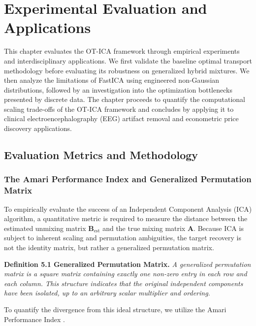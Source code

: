 \documentclass[12pt,a4paper,twoside,openany]{book}
\begin{document}
\chapter{Experimental Evaluation and Applications}

This chapter evaluates the OT-ICA framework through empirical experiments and interdisciplinary applications. 
We first validate the baseline optimal transport methodology before evaluating its robustness on generalized hybrid mixtures. 
We then analyze the limitations of FastICA using engineered non-Gaussian distributions, 
followed by an investigation into the optimization bottlenecks presented by discrete data. 
The chapter proceeds to quantify the computational scaling trade-offs of the OT-ICA framework and concludes by applying it 
to clinical electroencephalography (EEG) artifact removal and econometric price discovery applications.

\section{Evaluation Metrics and Methodology}

\subsection{The Amari Performance Index and Generalized Permutation Matrix}
To empirically evaluate the success of an Independent Component Analysis (ICA) algorithm, 
a quantitative metric is required to measure the distance between the estimated unmixing matrix $\mathbf{B}_{\text{est}}$ and 
the true mixing matrix $\mathbf{A}$. Because ICA is subject to inherent scaling and permutation ambiguities, 
the target recovery is not the identity matrix, but rather a generalized permutation matrix. 

\vspace{0.5em}
\noindent\textbf{Definition 5.1 Generalized Permutation Matrix.} \textit{A generalized permutation matrix is a square matrix containing 
exactly one non-zero entry in each row and each column. This structure indicates that the original independent components have 
been isolated, up to an arbitrary scalar multiplier and ordering.}
\vspace{0.5em}

To quantify the divergence from this ideal structure, we utilize the Amari Performance Index \cite{amari1996new}. 
\end{document}
